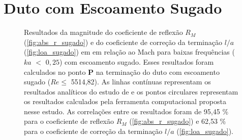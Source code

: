 \section{Duto com Escoamento Sugado}
\begin{figure}[ht!]
\begin{subfigure}{\scaleA \textwidth}
  
\end{subfigure}%
\begin{subfigure}{\scaleA \textwidth}
  
\end{subfigure}
\caption[Resultados de $R_{M}$ e $l/a$ em relação ao Mach para baixas frequências ($ka$ $<$ $0,25$) com escoamento sugado]{Resultados da magnitude do coeficiente de reflexão $R_{M}$ (\ref{fig:abs_r_sugado}) e do coeficiente de correção da terminação $l/a$ (\ref{fig:loa_sugado}) em  em relação ao Mach para baixas frequências ($ka$ $<$ $0,25$) com escoamento sugado. Esses resultados foram calculados no ponto $\textbf{P}$ na terminação do duto com escoamento sugado ($Re \leq$ 5514,82). As linhas contínuas representam os resultados analíticos do estudo de  e os pontos circulares representam os resultados calculados pela ferramenta computacional proposta nesse estudo. As correlações entre os resultados foram de 95,45 \% para o coeficiente de reflexão $R_{M}$ (\ref{fig:abs_r_sugado}) e 62,53 \% para o coeficiente de correção da terminação $l/a$ (\ref{fig:loa_sugado}).}
\label{fig:resultados_sugado}
\end{figure}

\newpage
\begin{figure}[ht!]
\centering
  
\end{figure}

\newpage
\begin{figure}[ht!]
\centering
  
\end{figure}
